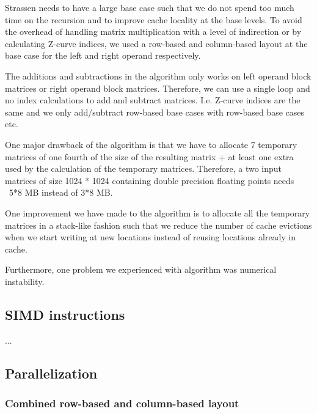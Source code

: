 Strassen needs to have a large base case such that we do not spend too much time on the recursion and to improve cache locality at the base levels. To avoid the overhead of handling matrix multiplication with a level of indirection or by calculating Z-curve indices, we used a row-based and column-based layout at the base case for the left and right operand respectively.

The additions and subtractions in the algorithm only works on left operand block matrices or right operand block matrices. Therefore, we can use a single loop and no index calculations to add and subtract matrices. I.e. Z-curve indices are the same and we only add/subtract row-based base cases with row-based base cases etc.

One major drawback of the algorithm is that we have to allocate 7 temporary matrices of one fourth of the size of the resulting matrix + at least one extra used by the calculation of the temporary matrices. Therefore, a two input matrices of size 1024 * 1024 containing double precision floating points needs ~5*8 MB instead of 3*8 MB.

One improvement we have made to the algorithm is to allocate all the temporary matrices in a stack-like fashion such that we reduce the number of cache evictions when we start writing at new locations instead of reusing locations already in cache.

Furthermore, one problem we experienced with algorithm was numerical instability.


\subsection{SIMD instructions}

...

\subsection{Parallelization}


\subsubsection{Combined row-based and column-based layout}

